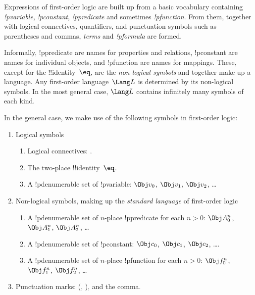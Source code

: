 \documentclass[../../include/open-logic-section]{subfiles}
\begin{document}



Expressions of first-order logic are built up from a basic vocabulary
containing \emph{!p{variable}}, \emph{!p{constant}},
\emph{!p{predicate}} and sometimes \emph{!p{function}}.  From them,
together with logical connectives, quantifiers, and punctuation
symbols such as parentheses and commas, \emph{terms} and
\emph{!p{formula}} are formed.

\begin{explain}
Informally, !p{predicate} are names for properties and relations,
!p{constant} are names for individual objects, and !p{function} are names
for mappings.  These, except for the !!{identity}~$\eq$, are the
\emph{non-logical symbols} and together make up a language.  Any
first-order language~$\Lang L$ is determined by its non-logical
symbols.  In the most general case, $\Lang L$ contains infinitely
many symbols of each kind.
\end{explain}

In the general case, we make use of the following symbols in
first-order logic:

\begin{enumerate}
\item Logical symbols
\begin{enumerate}
\item Logical connectives:
  \startycommalist
  .
\item The two-place !!{identity}~$\eq$.
\item A !p{denumerable} set of !p{variable}: $\Obj v_0$, $\Obj v_1$, $\Obj
  v_2$, \dots
\end{enumerate}
\item Non-logical symbols, making up the \emph{standard
  language} of first-order logic
\begin{enumerate}
\item A !p{denumerable} set of $n$-place !p{predicate} for each $n>0$: $\Obj
  A^n_0$, $\Obj A^n_1$, $\Obj A^n_2$, \dots
\item A !p{denumerable} set of !p{constant}: $\Obj c_0$, $\Obj c_1$, $\Obj
  c_2$, \dots.
\item A !p{denumerable} set of $n$-place !p{function} for each $n>0$:
  $\Obj f^n_0$, $\Obj f^n_1$, $\Obj f^n_2$, \dots
\end{enumerate}
\item Punctuation marks: (, ), and the comma.
\end{enumerate}
\end{document}
